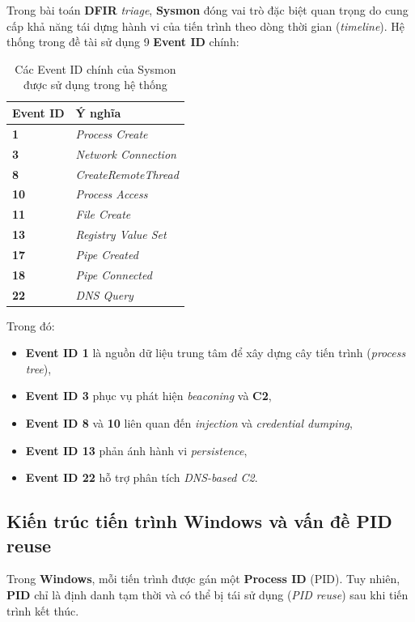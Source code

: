 \documentclass[../main.tex]{subfiles}
\begin{document}
Trong bài toán \textbf{DFIR} \textit{triage}, \textbf{Sysmon} đóng vai trò đặc biệt quan trọng do cung cấp khả năng tái dựng hành vi của tiến trình theo dòng thời gian (\textit{timeline}). Hệ thống trong đề tài sử dụng 9 \textbf{Event ID} chính:

\begin{table}[h]
\centering
\begin{tabular}{|l|l|}
\hline
\textbf{Event ID} & \textbf{Ý nghĩa} \\ \hline
\textbf{1} & \textit{Process Create} \\ \hline
\textbf{3} & \textit{Network Connection} \\ \hline
\textbf{8} & \textit{CreateRemoteThread} \\ \hline
\textbf{10} & \textit{Process Access} \\ \hline
\textbf{11} & \textit{File Create} \\ \hline
\textbf{13} & \textit{Registry Value Set} \\ \hline
\textbf{17} & \textit{Pipe Created} \\ \hline
\textbf{18} & \textit{Pipe Connected} \\ \hline
\textbf{22} & \textit{DNS Query} \\ \hline
\end{tabular}
\caption{Các Event ID chính của Sysmon được sử dụng trong hệ thống}
\end{table}

Trong đó:
\begin{itemize}
    \item \textbf{Event ID 1} là nguồn dữ liệu trung tâm để xây dựng cây tiến trình (\textit{process tree}),
    \item \textbf{Event ID 3} phục vụ phát hiện \textit{beaconing} và \textbf{C2},
    \item \textbf{Event ID 8} và \textbf{10} liên quan đến \textit{injection} và \textit{credential dumping},
    \item \textbf{Event ID 13} phản ánh hành vi \textit{persistence},
    \item \textbf{Event ID 22} hỗ trợ phân tích \textit{DNS-based C2}.
\end{itemize}

\subsection{Kiến trúc tiến trình Windows và vấn đề PID reuse}
\label{subsection:2.1.3}
Trong \textbf{Windows}, mỗi tiến trình được gán một \textbf{Process ID} (PID). Tuy nhiên, \textbf{PID} chỉ là định danh tạm thời và có thể bị tái sử dụng (\textit{PID reuse}) sau khi tiến trình kết thúc.
\end{document}
